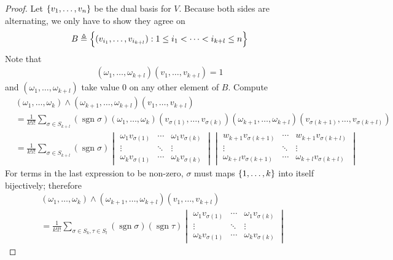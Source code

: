 \documentclass{report}
\begin{document}
\begin{proof}
Let $\{ v_1,\dots ,v_n \}$ be the dual basis for $V$. Because both sides are alternating, we only have to show they agree on 
\begin{align*}
B\triangleq \Big\{ (v_{i_1},\dots ,v_{i_{k+l}}):1\leq i_1< \cdots < i_{k+l} \leq n \Big\}
\end{align*}
Note that 
\begin{align*}
  (\omega_1,\dots ,\omega_{k+l})(v_1,\dots ,v_{k+l})=1
\end{align*}
and $(\omega_1,\dots , \omega_{k+l})$ take value $0$ on any other element of  $B$. Compute 
\begin{align*}
  &(\omega_1,\dots ,\omega_k)\wedge (\omega_{k+1},\dots ,\omega_{k+l}) (v_1,\dots ,v_{k+l})\\
  &= \frac{1}{k!l!}\sum_{\sigma \in S_{k+l}} (\operatorname{sgn}\sigma) (\omega_1,\dots ,\omega_k)(v_{\sigma (1)},\dots ,v_{\sigma (k)})(\omega_{k+1},\dots ,\omega_{k+l})(v_{\sigma (k+1)},\dots ,v_{\sigma (k+l)}) \\
  &= \frac{1}{k!l!}\sum_{\sigma \in S_{k+l}}(\operatorname{sgn}\sigma ) \begin{vmatrix}
      \omega_1 v_{\sigma (1)} & \cdots & \omega_1 v_{\sigma (k)}\\
      \vdots & \ddots & \vdots \\
      \omega_k v_{\sigma (1)} & \cdots & \omega_k v_{\sigma (k)}
  \end{vmatrix}  \begin{vmatrix}
      w_{k+1}v_{\sigma (k+1)} & \cdots & w_{k+1} v_{\sigma (k+l)} \\
      \vdots & \ddots & \vdots \\
      \omega_{k+l}v_{\sigma (k+1)} & \cdots & \omega_{k+l}v_{\sigma (k+l)}
  \end{vmatrix} 
\end{align*}
For terms in the last expression to be non-zero, $\sigma$ must maps $\{ 1,\dots ,k \}$ into itself bijectively; therefore 
\begin{align*}
  &(\omega_1,\dots ,\omega_k)\wedge (\omega_{k+1},\dots ,\omega_{k+l}) (v_1,\dots ,v_{k+l})\\
  &= \frac{1}{k!l!} \sum_{\sigma \in S_k,\tau \in S_l} (\operatorname{sgn}\sigma)(\operatorname{sgn}\tau) \begin{vmatrix}
      \omega_1 v_{\sigma (1)} & \cdots & \omega_1 v_{\sigma (k)} \\
      \vdots & \ddots & \vdots \\
      \omega_k v_{\sigma (1)} & \cdots & \omega_k v_{\sigma (k)}     

\end{vmatrix}
\end{align*}
\end{proof}
\end{document}
